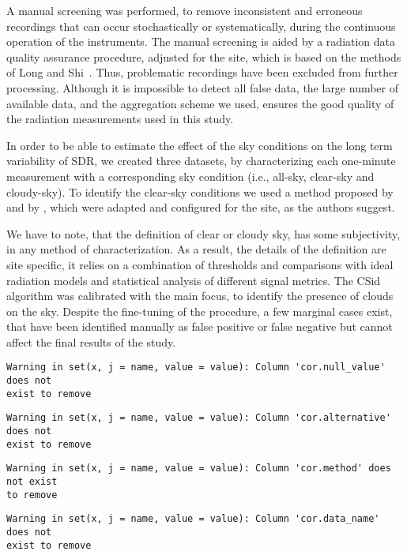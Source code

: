 \documentclass[applsci,article,submit,moreauthors,pdftex]{Definitions/mdpi}
\begin{document}
A manual screening was performed, to remove inconsistent and erroneous
recordings that can occur stochastically or systematically, during the
continuous operation of the instruments. The manual screening is aided
by a radiation data quality assurance procedure, adjusted for the site,
which is based on the methods of Long and
Shi~\citetext{\citeyear{Long2008a}; \citeyear{Long2006}}. Thus,
problematic recordings have been excluded from further processing.
Although it is impossible to detect all false data, the large number of
available data, and the aggregation scheme we used, ensures the good
quality of the radiation measurements used in this study.

In order to be able to estimate the effect of the sky conditions on the
long term variability of SDR, we created three datasets, by
characterizing each one-minute measurement with a corresponding sky
condition (i.e., all-sky, clear-sky and cloudy-sky). To identify the
clear-sky conditions we used a method proposed by \citet{Long2000} and
by \citet{Reno2016}, which were adapted and configured for the site, as
the authors suggest.

We have to note, that the definition of clear or cloudy sky, has some
subjectivity, in any method of characterization. As a result, the
details of the definition are site specific, it relies on a combination
of thresholds and comparisons with ideal radiation models and
statistical analysis of different signal metrics. The CSid algorithm was
calibrated with the main focus, to identify the presence of clouds on
the sky. Despite the fine-tuning of the procedure, a few marginal cases
exist, that have been identified manually as false positive or false
negative but cannot affect the final results of the study.

\begin{verbatim}
Warning in set(x, j = name, value = value): Column 'cor.null_value' does not
exist to remove
\end{verbatim}

\begin{verbatim}
Warning in set(x, j = name, value = value): Column 'cor.alternative' does not
exist to remove
\end{verbatim}

\begin{verbatim}
Warning in set(x, j = name, value = value): Column 'cor.method' does not exist
to remove
\end{verbatim}

\begin{verbatim}
Warning in set(x, j = name, value = value): Column 'cor.data_name' does not
exist to remove
\end{verbatim}
\end{document}
